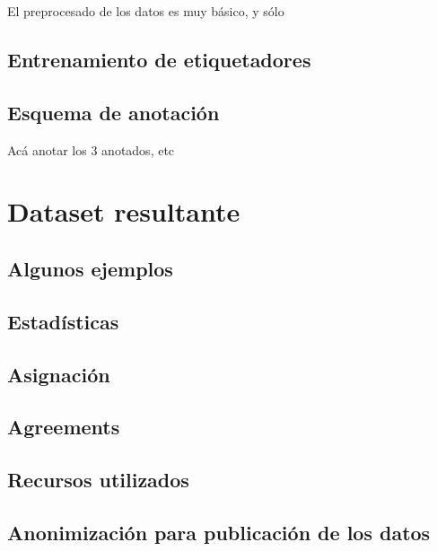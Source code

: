 El preprocesado de los datos es muy básico, y sólo


\subsection{Entrenamiento de etiquetadores}
\subsection{Esquema de anotación}
Acá anotar los 3 anotados, etc

%
%

\section{Dataset resultante}

\subsection{Algunos ejemplos}




\subsection{Estadísticas}
\subsection{Asignación}

\subsection{Agreements}
\subsection{Recursos utilizados}
\subsection{Anonimización para publicación de los datos}

